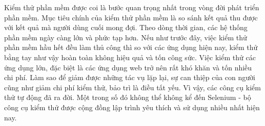 \documentclass[./../main_file.tex]{subfiles}
\begin{document}
	Kiểm thử phần mềm được coi là bước quan trọng nhất trong vòng đời phát triển phần mềm. Mục tiêu chính của kiểm thử phần mềm là so sánh kết quả thu được với kết quả mà người dùng cuối mong đợi. Theo dòng thời gian, các hệ thống phần mềm ngày càng lớn và phức tạp hơn. Nếu như trước đây, việc kiểm thử phần mềm hầu hết đều làm thủ công thì so với các ứng dụng hiện nay, kiểm thử bằng tay như vậy hoàn toàn không hiệu quả và tốn công sức. Việc kiểm thử các ứng dụng lớn, đặc biệt là các ứng dụng web trở nên rất khó khăn và tốn nhiều chi phí. Làm sao để giảm được những tác vụ lặp lại, sự can thiệp của con người cũng như giảm chi phí kiểm thử, bảo trì là điều tất yếu. Vì vậy, các công cụ kiểm thử tự động đã ra đời. Một trong số đó không thể không kể đến Selenium - bộ công cụ kiểm thử được cộng đồng lập trình yêu thích và sử dụng nhiều nhất hiện nay.

	\nocite{*}
	\printbibliography[heading=none]
	
	\clearpage
	
\end{document}
